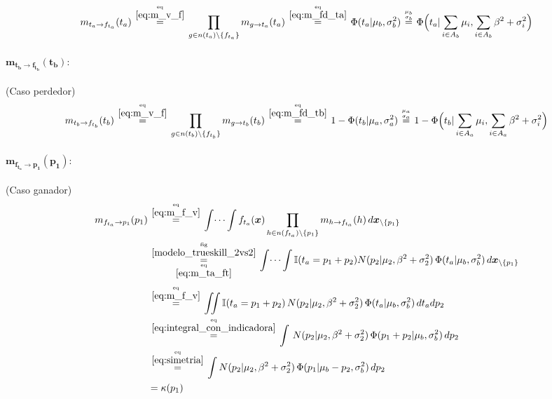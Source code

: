\documentclass[article]{jss}
\newcommand\hfrac[2]{\genfrac{}{}{0pt}{}{#1}{#2}} %
\begin{document}
\begin{appendix}
\begin{equation}\label{eq:m_ta_ft}
\begin{split}
 m_{t_a \rightarrow f_{t_a}}(t_a) \overset{\hfrac{\text{eq}}{\ref{eq:m_v_f}}}{=} \prod_{g \in n(t_a) \setminus  \{f_{t_a} \}} m_{g \rightarrow t_a} (t_a)  \overset{\hfrac{\text{eq}}{\ref{eq:m_fd_ta}}}{=} \Phi(t_a|\mu_b,\sigma_b^2) \overset{\hfrac{\mu_b}{\sigma_b}}{=} \Phi \Big(t_a| \sum_{i \in A_b} \mu_i , \sum_{i \in A_b} \beta^2 + \sigma_i^2 \Big) 
\end{split}
\end{equation}

\paragraph{$\bm{m_{t_b \rightarrow f_{t_b}}(t_b)}:$} (Caso perdedor)
\begin{equation}\label{eq:m_tb_ft}
\begin{split}
 m_{t_b \rightarrow f_{t_b}}(t_b) \overset{\hfrac{\text{eq}}{\ref{eq:m_v_f}}}{=} \prod_{g \in n(t_b) \setminus  \{f_{t_b} \}} m_{g \rightarrow t_b} (t_b)  \overset{\hfrac{\text{eq}}{\ref{eq:m_fd_tb}}}{=} 1- \Phi(t_b|\mu_a,\sigma_a^2) \overset{\hfrac{\mu_a}{\sigma_a}}{=} 1 - \Phi \Big(t_b| \sum_{i \in A_a} \mu_i , \sum_{i \in A_a} \beta^2 + \sigma_i^2 \Big) 
\end{split}
\end{equation}



\paragraph{$\bm{m_{f_{t_a} \rightarrow p_1}(p_1)}:$} (Caso ganador)
\begin{equation}\label{eq:m_fta_p_inicial}
\begin{split}
m_{f_{t_a} \rightarrow p_1}(p_1)  &\overset{\hfrac{\text{eq}}{\ref{eq:m_f_v}}}{=} \int \dots \int f_{t_a}(\bm{x}) \prod_{h \in n(f_{t_a}) \setminus \{p_1\} } m_{h \rightarrow f_{t_a}}(h) \, d\bm{x}_{\setminus \{p_1\} }  \\
&\overset{\hfrac{\text{fig}}{\ref{modelo_trueskill_2vs2}}}{\underset{\hfrac{\text{eq}}{\ref{eq:m_ta_ft}}}{=}} \int \dots \int \mathbb{I}( t_a = p_1 + p_2) N(p_2| \mu_2, \beta^2 + \sigma_2^2 ) \, \Phi (t_a| \mu_b , \sigma_b^2 ) \, d\bm{x}_{\setminus \{p_1\} }\\[0.1cm]
&\overset{\hfrac{\text{eq}}{\ref{eq:m_f_v}}}{=} \iint \mathbb{I}( t_a = p_1 + p_2) \, N(p_2| \mu_2, \beta^2 + \sigma_2^2 ) \, \Phi (t_a| \mu_b , \sigma_b^2 ) \, dt_a dp_2 \\
&\overset{\hfrac{\text{eq}}{\ref{eq:integral_con_indicadora}}}{=} \int  \, N(p_2| \mu_2, \beta^2 + \sigma_2^2 ) \, \Phi (p_1 + p_2| \mu_b , \sigma_b^2 ) \, dp_2 \\
&\overset{\hfrac{\text{eq}}{\ref{eq:simetria}}}{=} \int  N(p_2| \mu_2, \beta^2 + \sigma_2^2 ) \, \Phi (p_1 | \mu_b - p_2 , \sigma_b^2) \, dp_2 \\
&= \kappa(p_1)
\end{split}
\end{equation}


\end{appendix}
\end{document}
